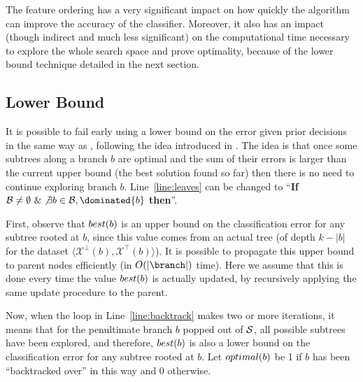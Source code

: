 \documentclass{llncs}
\newcommand{\setex}[1]{\ensuremath{{\mathcal X}^{#1}}\xspace}
\newcommand{\posex}{{\setex{\top}}\xspace}
\newcommand{\negex}{{\setex{\bot}}\xspace}
\newcommand{\bud}[0]{\ensuremath{{\cal B}}}
\newcommand{\sequence}[0]{\ensuremath{{\cal S}}}
\newcommand{\best}[1][]{\ensuremath{\ifthenelse{\equal{#1}{}}{{best}}{{best({#1})}}}}
\newcommand{\opt}[1][]{\ensuremath{\ifthenelse{\equal{#1}{}}{optimal}{optimal({#1})}}}
\newcommand{\abranch}[0]{\ensuremath{b}}
\newcommand{\mdepth}[0]{\ensuremath{k}}
\begin{document}
The feature ordering has a very significant impact on how quickly the algorithm can improve the accuracy of the classifier. Moreover, it also has an impact (though indirect and much less significant) on the computational time necessary to explore the whole search space and prove optimality, because of the lower bound technique detailed in the next section.


\subsection{Lower Bound}
\label{sec:lb}

It is possible to fail early using a lower bound on the error given prior decisions in the same way as \murtree, following the idea introduced in \cite{dl8}. The idea is that once some subtrees along a branch $\abranch$ are optimal and the sum of their errors is larger than the current upper bound (the best solution found so far) then there is no need to continue exploring branch $\abranch$. Line~\ref{line:leaves} can be changed to ``\textbf{If} $\bud \neq \emptyset ~\& \not\exists \abranch \in \bud, \dominated{\abranch}$ \textbf{then}''. %




First, observe that $\best[\abranch]$ is an upper bound on the classification error for any subtree rooted at $\abranch$, since this value comes from an actual tree (of depth $\mdepth - |\abranch|$ for the dataset $\langle \negex(\abranch),\posex(\abranch) \rangle$). It is possible to propagate this upper bound to parent nodes efficiently (in $O(|\branch|)$ time). Here we assume that this is done every time the value $\best[\abranch]$ is actually updated, by recursively applying the same update procedure to the parent.


Now, when the loop in Line~\ref{line:backtrack} makes two or more iterations, it means that for the penultimate branch $\abranch$ popped out of \sequence, all possible subtrees have been explored, and therefore, $\best[\abranch]$ is also a lower bound on the classification error for any subtree rooted at $\abranch$. Let $\opt[\abranch]$ be 1 if $\abranch$ has been ``backtracked over'' in this way and 0 otherwise.
\end{document}
